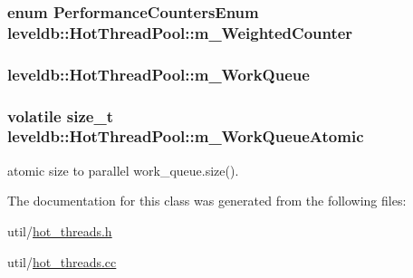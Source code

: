 \subsubsection[{m\+\_\+\+Weighted\+Counter}]{\setlength{\rightskip}{0pt plus 5cm}enum {\bf Performance\+Counters\+Enum} leveldb\+::\+Hot\+Thread\+Pool\+::m\+\_\+\+Weighted\+Counter}\label{classleveldb_1_1_hot_thread_pool_a2ecf9d61378505a8f43335bc2017078b}
\hypertarget{classleveldb_1_1_hot_thread_pool_a798f6a1fa0e086801bc3a23ad86a4ee1}{}
\subsubsection[{m\+\_\+\+Work\+Queue}]{ leveldb\+::\+Hot\+Thread\+Pool\+::m\+\_\+\+Work\+Queue}\label{classleveldb_1_1_hot_thread_pool_a798f6a1fa0e086801bc3a23ad86a4ee1}
\hypertarget{classleveldb_1_1_hot_thread_pool_a3a0aafc7c581ea064fb79c334d918d57}{}
\subsubsection[{m\+\_\+\+Work\+Queue\+Atomic}]{\setlength{\rightskip}{0pt plus 5cm}volatile size\+\_\+t leveldb\+::\+Hot\+Thread\+Pool\+::m\+\_\+\+Work\+Queue\+Atomic}\label{classleveldb_1_1_hot_thread_pool_a3a0aafc7c581ea064fb79c334d918d57}


atomic size to parallel work\+\_\+queue.\+size(). 



The documentation for this class was generated from the following files\+:\begin{DoxyCompactItemize}
\item 
util/\hyperlink{hot__threads_8h}{hot\+\_\+threads.\+h}\item 
util/\hyperlink{hot__threads_8cc}{hot\+\_\+threads.\+cc}\end{DoxyCompactItemize}
